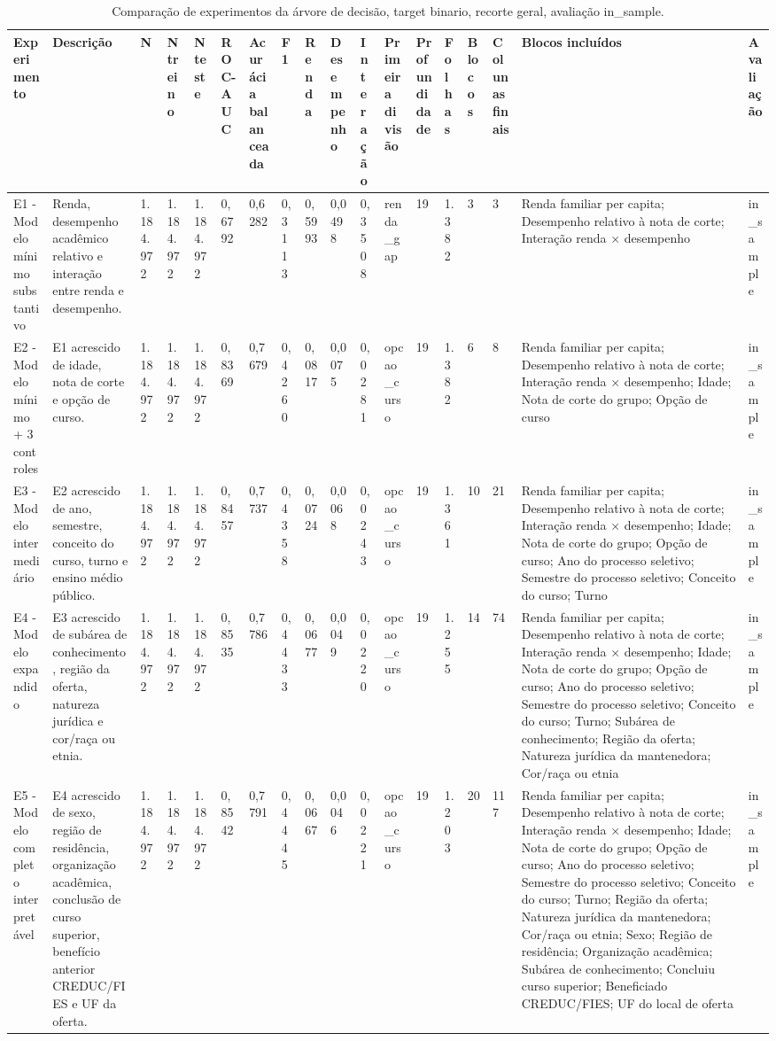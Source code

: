\begin{table}
\caption{Comparação de experimentos da árvore de decisão, target binario, recorte geral, avaliação in_sample.}
\label{tab:tabela_treeClassification_19_profundidade_binario_recorte_geral_in_sample}
\begin{tabular}{llllllllllllllllll}
\toprule
Experimento & Descrição & N & N treino & N teste & ROC-AUC & Acurácia balanceada & F1 & Renda & Desempenho & Interação & Primeira divisão & Profundidade & Folhas & Blocos & Colunas finais & Blocos incluídos & Avaliação \\
\midrule
E1 - Modelo mínimo substantivo & Renda, desempenho acadêmico relativo e interação entre renda e desempenho. & 1.184.972 & 1.184.972 & 1.184.972 & 0,6792 & 0,6282 & 0,3113 & 0,5993 & 0,0498 & 0,3508 & renda\_gap & 19 & 1.382 & 3 & 3 & Renda familiar per capita; Desempenho relativo à nota de corte; Interação renda × desempenho & in\_sample \\
E2 - Modelo mínimo + 3 controles & E1 acrescido de idade, nota de corte e opção de curso. & 1.184.972 & 1.184.972 & 1.184.972 & 0,8369 & 0,7679 & 0,4260 & 0,0817 & 0,0075 & 0,0281 & opcao\_curso & 19 & 1.382 & 6 & 8 & Renda familiar per capita; Desempenho relativo à nota de corte; Interação renda × desempenho; Idade; Nota de corte do grupo; Opção de curso & in\_sample \\
E3 - Modelo intermediário & E2 acrescido de ano, semestre, conceito do curso, turno e ensino médio público. & 1.184.972 & 1.184.972 & 1.184.972 & 0,8457 & 0,7737 & 0,4358 & 0,0724 & 0,0068 & 0,0243 & opcao\_curso & 19 & 1.361 & 10 & 21 & Renda familiar per capita; Desempenho relativo à nota de corte; Interação renda × desempenho; Idade; Nota de corte do grupo; Opção de curso; Ano do processo seletivo; Semestre do processo seletivo; Conceito do curso; Turno & in\_sample \\
E4 - Modelo expandido & E3 acrescido de subárea de conhecimento, região da oferta, natureza jurídica e cor/raça ou etnia. & 1.184.972 & 1.184.972 & 1.184.972 & 0,8535 & 0,7786 & 0,4433 & 0,0677 & 0,0049 & 0,0220 & opcao\_curso & 19 & 1.255 & 14 & 74 & Renda familiar per capita; Desempenho relativo à nota de corte; Interação renda × desempenho; Idade; Nota de corte do grupo; Opção de curso; Ano do processo seletivo; Semestre do processo seletivo; Conceito do curso; Turno; Subárea de conhecimento; Região da oferta; Natureza jurídica da mantenedora; Cor/raça ou etnia & in\_sample \\
E5 - Modelo completo interpretável & E4 acrescido de sexo, região de residência, organização acadêmica, conclusão de curso superior, benefício anterior CREDUC/FIES e UF da oferta. & 1.184.972 & 1.184.972 & 1.184.972 & 0,8542 & 0,7791 & 0,4445 & 0,0667 & 0,0046 & 0,0221 & opcao\_curso & 19 & 1.203 & 20 & 117 & Renda familiar per capita; Desempenho relativo à nota de corte; Interação renda × desempenho; Idade; Nota de corte do grupo; Opção de curso; Ano do processo seletivo; Semestre do processo seletivo; Conceito do curso; Turno; Região da oferta; Natureza jurídica da mantenedora; Cor/raça ou etnia; Sexo; Região de residência; Organização acadêmica; Subárea de conhecimento; Concluiu curso superior; Beneficiado CREDUC/FIES; UF do local de oferta & in\_sample \\

\end{tabular}
\end{table}
